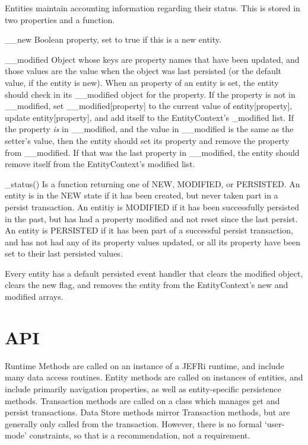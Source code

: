 \documentclass{article}
\renewcommand{\|}{\textbar}
\begin{document}
Entities maintain accounting information regarding their status. This is stored
in two properties and a function.

{\ilcode \_\_new} Boolean property, set to true if this is a new entity.

{\ilcode \_\_modified} Object whose keys are property names that have been
updated, and those values are the value when the object was last persisted (or
the default value, if the entity is new). When an property of an entity is set,
the entity should check in its {\ilcode \_\_modified} object for the property.
If the property is not in \_\_modified, set {\ilcode \_\_modified[property]} to
the current value of {\ilcode entity[property]}, update {\ilcode
entity[property]}, and add itself to the EntityContext's {\ilcode \_modified}
list. If the property {\it  is} in {\ilcode \_\_modified}, and the value in
{\ilcode \_\_modified} is the same as the setter's value, then the entity should
set its property and remove the property from \_\_modified. If that was the last
property in \_\_modified, the entity should remove itself from the
EntityContext's modified list.

{\ilcode \_status()} Is a function returning one of {\ilcode NEW}, {\ilcode
MODIFIED}, or {\ilcode PERSISTED}. An entity is in the {\ilcode NEW} state if it
has been created, but never taken part in a {\ilcode persist} transaction. An
entitiy is {\ilcode MODIFIED} if it has been successfully persisted in the past,
but has had a property modified and not reset since the last persist. An entity
is {\ilcode PERSISTED} if it has been part of a successful persist transaction,
and has not had any of its property values updated, or all its property have
been set to their last persisted values.

Every entity has a default {\ilcode persisted} event handler that clears the
modified object, clears the new flag, and removes the entity from the
EntityContext's new and modified arrays.

\section{API}

Runtime Methods are called on an instance of a JEFRi runtime, and include many
data access routines. Entity methods are called on instances of entities, and
include primarily navigation properties, as well as entity-specific persistence
methods. Transaction methods are called on a class which manages {\ilcode get}
and {\ilcode persist} transactions. Data Store methods mirror Transaction
methods, but are generally only called from the transaction. However, there is
no formal `user-mode' constraints, so that is a recommendation, not a
requirement.
\end{document}
